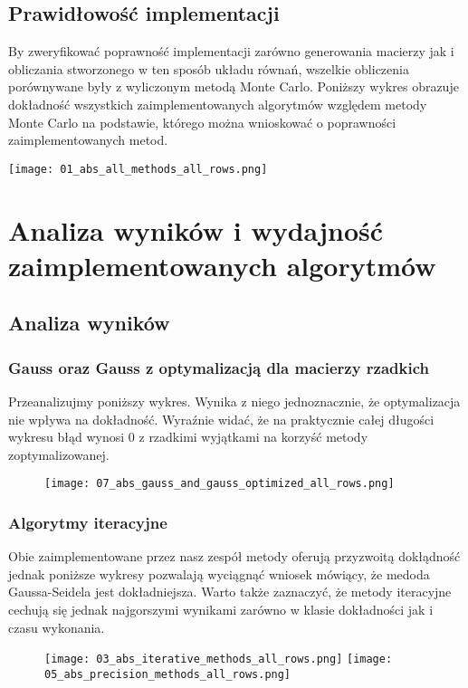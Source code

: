 \subsection{Prawidłowość implementacji}
By zweryfikować poprawność implementacji zarówno generowania macierzy jak i obliczania stworzonego w ten sposób układu równań, wszelkie obliczenia porównywane były z wyliczonym metodą Monte Carlo. Poniższy wykres obrazuje dokładność wszystkich zaimplementowanych algorytmów względem metody Monte Carlo na podstawie, którego można wnioskować o poprawności zaimplementowanych metod.

\texttt{[image: 01\_abs\_all\_methods\_all\_rows.png]}

\section{Analiza wyników i wydajność zaimplementowanych algorytmów}

\subsection{Analiza wyników}
\subsubsection{Gauss oraz Gauss z optymalizacją dla macierzy rzadkich}
Przeanalizujmy poniższy wykres. Wynika z niego jednoznacznie, że optymalizacja nie wpływa na dokładność. Wyraźnie widać, że na praktycznie całej długości wykresu błąd wynosi 0 z rzadkimi wyjątkami na korzyść metody zoptymalizowanej.
\begin{figure}[h]
\centering
\texttt{[image: 07\_abs\_gauss\_and\_gauss\_optimized\_all\_rows.png]}
\end{figure}

\subsubsection{Algorytmy iteracyjne}
Obie zaimplementowane przez nasz zespół metody oferują przyzwoitą dokłądność jednak poniższe wykresy pozwalają wyciągnąć wniosek mówiący, że medoda Gaussa-Seidela jest dokładniejsza. Warto także zaznaczyć, że metody iteracyjne cechują się jednak najgorszymi wynikami zarówno w klasie dokładności jak i czasu wykonania.

\begin{figure}[h]
\centering
\texttt{[image: 03\_abs\_iterative\_methods\_all\_rows.png]}
\texttt{[image: 05\_abs\_precision\_methods\_all\_rows.png]}
\end{figure}
